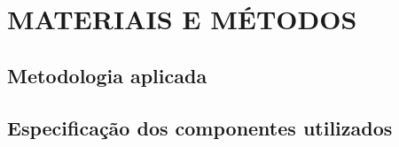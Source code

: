 \chapter{MATERIAIS E MÉTODOS}
\label{chap:metod}


\section{Metodologia aplicada}
\label{sec:metaplic}




\section{Especificação dos componentes utilizados} 
\label{sec:especif}


